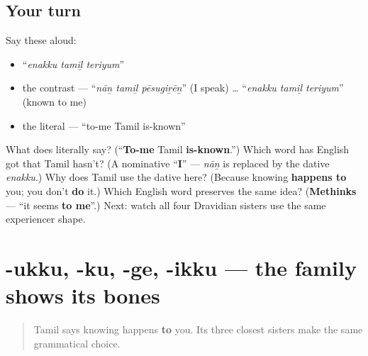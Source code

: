 \subsection*{Your turn}
Say these aloud:

\begin{itemize}
\raggedright
  \item \textquotedblleft{}\emph{enakku tamiḻ teriyum}\textquotedblright{}
  \item the contrast — \textquotedblleft{}\emph{nāṉ tamiḻ pēsugiṟēṉ}\textquotedblright{} (I speak) … \textquotedblleft{}\emph{enakku tamiḻ teriyum}\textquotedblright{} (known to me)
  \item the literal — \textquotedblleft{}to-me Tamil is-known\textquotedblright{}
\end{itemize}

\begin{tcolorbox}[breakable,colback=teal!4,colframe=teal!35!black,title={Before you move on}]
What does \textbf{  } literally say? (\textquotedblleft{}\textbf{To-me} Tamil \textbf{is-known}.\textquotedblright{}) Which word has English got that Tamil hasn't? (A nominative \textquotedblleft{}\textbf{I}\textquotedblright{} — \emph{nāṉ} is replaced by the dative \emph{enakku}.) Why does Tamil use the dative here? (Because knowing \textbf{happens to} you; you don't \textbf{do} it.) Which English word preserves the same idea? (\textbf{Methinks} — \textquotedblleft{}it seems \textbf{to me}\textquotedblright{}.) Next: watch all four Dravidian sisters use the same experiencer shape.
\end{tcolorbox}
\section[\texorpdfstring{\ta{எனக்கு} / \te{నాకు} … (enakku / nāku …)}{எனக்கு / నాకు … (enakku / nāku …)}]{-ukku, -ku, -ge, -ikku — the family shows its bones}

\label{lesson:TA-C06-dative-subject-family}



\begin{quote}
Tamil says knowing happens \textbf{to} you. Its three closest sisters make the same grammatical choice.
\end{quote}

